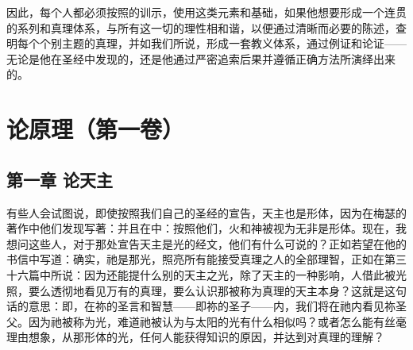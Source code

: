 因此，每个人都必须按照的训示，使用这类元素和基础，如果他想要形成一个连贯的系列和真理体系，与所有这一切的理性相和谐，以便通过清晰而必要的陈述，查明每个个别主题的真理，并如我们所说，形成一套教义体系，通过例证和论证——无论是他在圣经中发现的，还是他通过严密追索后果并遵循正确方法所演绎出来的。\par



\section{论原理（第一卷）}


\subsection{第一章 论天主}

有些人会试图说，即使按照我们自己的圣经的宣告，天主也是形体，因为在梅瑟的著作中他们发现写著：并且在中：按照他们，火和神被视为无非是形体。现在，我想问这些人，对于那处宣告天主是光的经文，他们有什么可说的？正如若望在他的书信中写道：确实，祂是那光，照亮所有能接受真理之人的全部理智，正如在第三十六篇中所说：因为还能提什么别的天主之光，除了天主的一种影响，人借此被光照，要么透彻地看见万有的真理，要么认识那被称为真理的天主本身？这就是这句话的意思：即，在祢的圣言和智慧——即祢的圣子——内，我们将在祂内看见祢圣父。因为祂被称为光，难道祂被认为与太阳的光有什么相似吗？或者怎么能有丝毫理由想象，从那形体的光，任何人能获得知识的原因，并达到对真理的理解？\par

